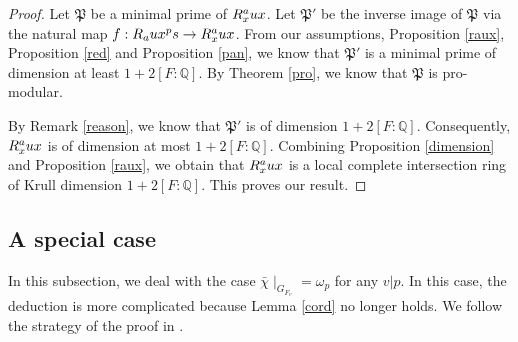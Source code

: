 \documentclass[12pt]{amsart}
\theoremstyle{plain}
\theoremstyle{definition}
\theoremstyle{remark}
\begin{document}
\begin{proof}
	Let $\mathfrak{P}$ be a minimal prime of $ R_x^\textnormal{aux}$. Let $\mathfrak{P}'$ be the inverse image of $\mathfrak{P}$ via the natural map $f: R_\textnormal{aux}^\textnormal{ps} \to R_x^\textnormal{aux}$. From our assumptions, Proposition \ref{raux}, Proposition \ref{red} and Proposition \ref{pan}, we know that $\mathfrak{P}'$ is a minimal prime of dimension at least $1+2[F:\mathbb{Q}] $. By Theorem \ref{pro}, we know that $\mathfrak{P}$ is pro-modular. 
	
	By Remark \ref{reason}, we know that $ \mathfrak{P}'$ is of dimension $1+2[F:\mathbb{Q}] $. Consequently, $ R_x^\textnormal{aux}$ is of dimension at most $1+2[F:\mathbb{Q}] $. Combining Proposition \ref{dimension} and Proposition \ref{raux}, we obtain that $R_x^\textnormal{aux}$ is a local complete intersection ring of Krull dimension $1+2[F:\mathbb{Q}]$. This proves our result.
	
\end{proof}

\subsection{A special case}
In this subsection, we deal with the case $\bar{\chi}\mid_{G_{F_v}} = \omega_p$ for any $v|p$. In this case, the deduction is more complicated because Lemma \ref{cord} no longer holds. We follow the strategy of the proof in \cite[Section 7.4]{pan2022fontaine}.
\end{document}
